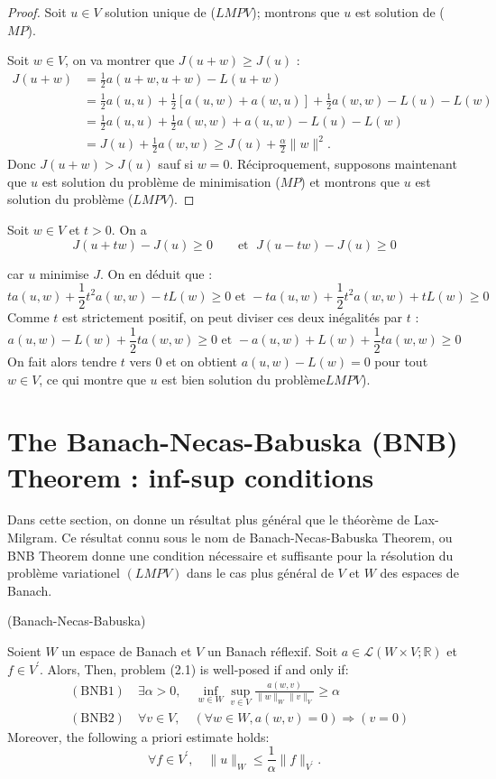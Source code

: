 \begin{proof}
Soit $u \in V$ solution unique de ($LMPV$); montrons que $u$ est solution de ($MP$). 

Soit $w \in V$, on va montrer que $J(u+w) \geq J(u)$ :
$$
\begin{aligned}
	J(u+w) &=\frac{1}{2} a(u+w, u+w)-L(u+w) \\
	&=\frac{1}{2} a(u, u)+\frac{1}{2}[a(u, w)+a(w, u)]+\frac{1}{2} a(w, w)-L(u)-L(w) \\
	&=\frac{1}{2} a(u, u)+\frac{1}{2} a(w, w)+a(u, w)-L(u)-L(w) \\
	&=J(u)+\frac{1}{2} a(w, w)\geq J(u)+\frac{\alpha}{2}\|w\|^{2}.
\end{aligned}
$$
Donc $J(u+w)>J(u)$ sauf si $w=0$.
Réciproquement, supposons maintenant que $u$ est solution du problème de minimisation ($MP$)  et montrons que $u$ est solution du problème ($LMPV$).  
\end{proof}

Soit $w \in V$ et $t>0 .$ On a $$ J(u+t w)-J(u) \geq 0\qquad \text{et } \; J(u-t w)-J(u) \geq 0$$ 

car $u$ minimise $J$. On en déduit que :
$$
t a(u, w)+\frac{1}{2} t^{2} a(w, w) -tL(w)\geq 0 \text { et }-t a(u, w)+\frac{1}{2} t^{2} a(w, w) +tL(w)\geq 0
$$
Comme $t$ est strictement positif, on peut diviser ces deux inégalités par $t$ :
$$
a(u, w)-L(w)+\frac{1}{2} t a(w, w) \geq 0 \text { et }-a(u, w)+L(w)+\frac{1}{2} ta(w, w) \geq 0
$$
On fait alors tendre $t$ vers 0 et on obtient $a(u, w)-L(w)=0$ pour tout $w \in V$, ce qui montre que $u$ est bien solution $\mathrm{du}$ problème$LMPV$).  

\section{The Banach-Necas-Babuska (BNB) Theorem : inf-sup conditions}
Dans cette section, on donne un résultat plus général que le théorème de  Lax-Milgram.  Ce résultat connu sous le nom de  Banach-Necas-Babuska Theorem, ou BNB Theorem donne une  condition nécessaire et suffisante pour la résolution du problème variationel $(LMPV)$ dans le cas plus général de $V$ et $W$ des espaces de Banach. 


\begin{theorem}(Banach-Necas-Babuska)\
	
Soient  $W$ un espace de Banach  et $V$ un   Banach réflexif.  Soit  $a \in \mathcal{L}(W \times V ; \mathbb{R})$  et  $f \in V^{\prime}$. Alors, Then, problem (2.1) is well-posed if and only if:
$$
\begin{aligned}
	&(\mathrm{BNB} 1) \quad \exists \alpha>0, \quad \inf _{w \in W} \sup _{v \in V} \frac{a(w, v)}{\|w\|_{W}\|v\|_{V}} \geq \alpha \\
	&(\mathrm{BNB} 2) \quad \forall v \in V, \quad(\forall w \in W, a(w, v)=0) \Longrightarrow(v=0)
\end{aligned}
$$
Moreover, the following a priori estimate holds:
$$
\forall f \in V^{\prime}, \quad\|u\|_{W} \leq \frac{1}{\alpha}\|f\|_{V^{\prime}}.
$$

\end{theorem}


